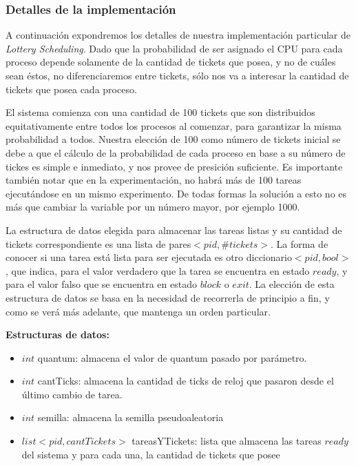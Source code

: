 \subsubsection{Detalles de la implementaci\'on}

A continuaci\'on expondremos los detalles de nuestra implementaci\'on particular de \textit{Lottery Scheduling}. Dado que la probabilidad de ser asignado el CPU para cada proceso depende solamente de la cantidad de tickets que posea, y no de cu\'ales sean \'estos, no diferenciaremos entre tickets, s\'olo nos va a interesar la cantidad de tickets que posea cada proceso.


\vspace{2mm}

El sistema comienza con una cantidad de 100 tickets que son distribuidos equitativamente entre todos los procesos al comenzar, para garantizar la misma probabilidad a todos. Nuestra elecci\'on de 100 como n\'umero de tickets inicial se debe a que el c\'alculo de la probabilidad de cada proceso en base a su n\'umero de tickes es simple e inmediato, y nos provee de presici\'on suficiente. Es importante tambi\'en notar que en la experimentaci\'on, no habr\'a m\'as de 100 tareas ejecut\'andose en un mismo experimento. De todas formas la soluci\'on a esto no es m\'as que cambiar la variable por un n\'umero mayor, por ejemplo 1000.

\vspace{2mm}

La estructura de datos elegida para almacenar las tareas listas y su cantidad de tickets correspondiente es una lista de pares$<pid, \#tickets>$. La forma de conocer si una tarea est\'a lista para ser ejecutada es otro diccionario$<pid, bool>$, que indica, para el valor verdadero que la tarea se encuentra en estado $ready$, y para el valor falso que se encuentra en estado $block$ o $exit$. La elecci\'on de esta estructura de datos se basa en la necesidad de recorrerla de principio a fin, y como se ver\'a m\'as adelante, que mantenga un orden particular.

\vspace{2mm}

\textbf{Estructuras de datos:}

\begin{itemize}

\item $int$ quantum: almacena el valor de quantum pasado por par\'ametro.

\item $int$ cantTicks: almacena la cantidad de ticks de reloj que pasaron desde el \'ultimo cambio de tarea.

\item $int$ semilla: almacena la semilla pseudoaleatoria

\item $list<pid, cantTickets>$ tareasYTickets: lista que almacena las tareas $ready$ del sistema y para cada una, la cantidad de tickets que posee

\end{itemize}


